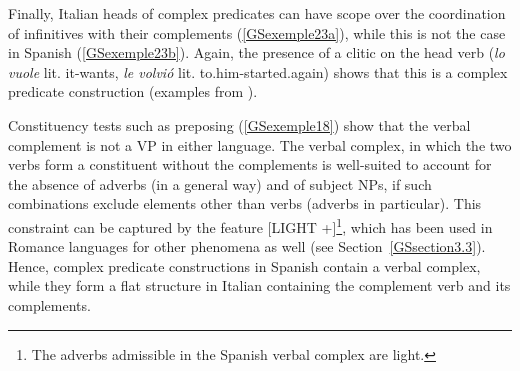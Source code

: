 \documentclass[output=paper
	        ,collection
	        ,collectionchapter
 	        ,biblatex
                ,babelshorthands
                ,newtxmath
                ,draftmode
                ,colorlinks, citecolor=brown
]{langscibook}
\begin{document}
{	\label{GSexemple22b}		
	
	\label{GSexemple22c}	
\zl

Finally, Italian heads of complex predicates can have scope over the coordination of infinitives with their complements (\ref{GSexemple23a}), while this is not the case in Spanish (\ref{GSexemple23b}). Again, the presence of a clitic on the head verb (\emph{lo vuole} lit. it-wants, \emph{le volvi\'o} lit. to.him-started.again) shows that this is a complex predicate construction (examples from \citealt[136-137]{AG2010}).

\eal
	\label{GSexemple23} 
	\label{GSexemple23a}

	\label{GSexemple23b}	
\zl

Constituency tests such as preposing (\ref{GSexemple18}) show that the verbal complement is not a VP in either language. The verbal complex, in which the two verbs form a constituent without the complements is well-suited to account for the absence of adverbs (in a general way) and of subject NPs, if such combinations exclude elements other than verbs (adverbs in particular). This constraint can be captured by the feature [LIGHT +]\footnote{The adverbs admissible in the Spanish verbal complex are light.}, which has been used in Romance languages for other phenomena as well \citep{abeille2000french} (see Section~\ref{GSsection3.3}). Hence, complex predicate constructions in Spanish contain a verbal complex, while they form a flat structure in Italian containing the complement verb and its complements. 

}
\end{document}
